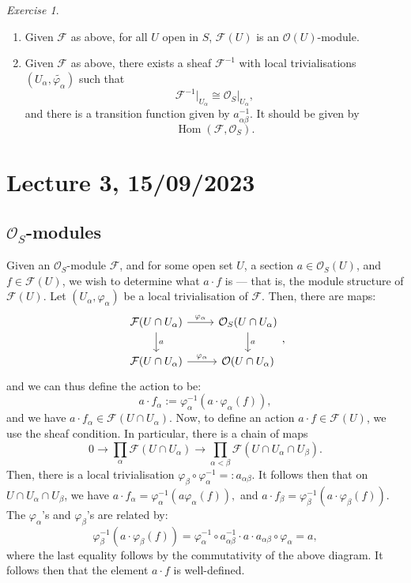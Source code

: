 \documentclass[a4paper]{report}
\theoremstyle{definition}
\theoremstyle{remark}
\theoremstyle{proposition}
\theoremstyle{conjecture}
\theoremstyle{lemma}
\theoremstyle{corollary}
\theoremstyle{exercise}
\newtheorem{exercise}{Exercise}
\theoremstyle{example}
\newcommand{\mcal}{\mathcal}
\newcommand{\on}{\operatorname}
\begin{document}
\begin{exercise}\leavevmode
    \begin{enumerate}
        \item Given $\mcal{F}$ as above, for all $U$ open in $S$,
            $\mcal{F}(U)$ is an $\mcal{O}(U)$-module.
        \item Given $\mcal{F}$ as above, there exists a sheaf $\mcal{F}^{-1}$
            with local trivialisations $(U_\alpha,\widetilde{\varphi_\alpha})$
            such that $$\mcal{F}^{-1}\vert_{U_\alpha} \cong \mcal{O}_S\vert_{U_\alpha},$$
            and there is a transition function given by 
            $a_{\alpha\beta}^{-1}$. It should be given by 
            $$\on{Hom}(\mcal{F},\mcal{O}_S).$$
    \end{enumerate}
\end{exercise}

\section{Lecture 3, 15/09/2023}

\subsection{$\mcal{O}_S$-modules}

Given an $\mcal{O}_S$-module $\mcal{F}$, and for some open set $U$,
a section $a \in \mcal{O}_S(U)$, and $f\in\mcal{F}(U)$, we wish to
determine what $a\cdot f$ is --- that is, the module structure 
of $\mcal{F}(U)$. 
Let $(U_\alpha,\varphi_\alpha)$ be a local trivialisation of $\mcal{F}$. 
Then, there are maps:
$$\begin{tikzcd}
\mathcal{F}(U\cap U_\alpha) \arrow[r, "\varphi_\alpha"] \arrow[d, "a"] & \mathcal{O}_S(U\cap U_\alpha) \arrow[d, "a"] \\
\mcal{F}(U\cap U_\alpha) \arrow[r, "\varphi_\alpha"]                   & \mcal{O}(U\cap U_\alpha)                    
\end{tikzcd},$$
and we can thus define the action to be:
$$a\cdot f_\alpha := \varphi_\alpha^{-1}(a\cdot \varphi_\alpha(f)),$$
and we have $a\cdot f_\alpha \in \mcal{F}(U\cap U_\alpha)$.
Now, to define an action $a\cdot f \in \mcal{F}(U)$, we use the sheaf
condition. 
In particular, there is a chain of maps
$$0 \longrightarrow \prod_\alpha \mcal{F}(U\cap U_\alpha) \longrightarrow \prod_{\alpha<\beta}\mcal{F}(U\cap U_\alpha \cap U_\beta).$$
Then, there is a local trivialisation $\varphi_\beta\circ\varphi_\alpha^{-1} =:a_{\alpha\beta}$.
It follows then that on $U\cap U_\alpha \cap U_\beta$, we have 
$a\cdot f_\alpha = \varphi_\alpha^{-1}(a \varphi_\alpha(f)),$
and
$a\cdot f_\beta = \varphi_\beta^{-1}(a\cdot \varphi_\beta(f))$.
The $\varphi_\alpha$'s and $\varphi_\beta$'s are related by:
$$\varphi_\beta^{-1}(a\cdot\varphi_\beta(f)) = \varphi_\alpha^{-1}\circ a_{\alpha\beta}^{-1} \cdot a \cdot a_{\alpha\beta}\circ \varphi_\alpha = a,$$
where the last equality follows by the commutativity of the above diagram.
It follows then that the element $a\cdot f$ is well-defined.
\end{document}

